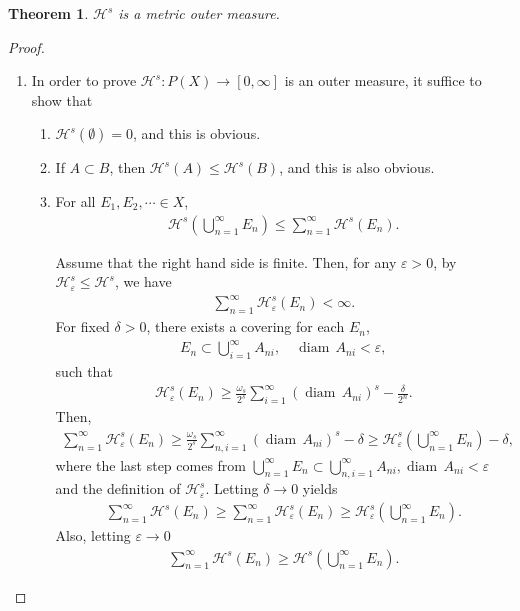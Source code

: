 \documentclass[11pt]{book}
\newtheorem{theorem}{Theorem}[chapter]
\theoremstyle{definition}
\numberwithin{equation}{chapter}
\def\diam{{\operatorname{diam}\,}}
\begin{document}
\begin{theorem}
$\mathcal{H}^s$ is a metric outer measure.
\end{theorem}
\begin{proof}
~\begin{enumerate}[label=(\alph*)]
    \item In order to prove $\mathcal{H}^s: P(X) \to [0,\infty]$ is an outer measure, it suffice to show that
    \begin{enumerate}[label=\arabic*)]
        \item $\mathcal{H}^s(\emptyset) = 0$, and this is obvious.
    
        \item If $A \subset B$, then $\mathcal{H}^s(A) \leq \mathcal{H}^s(B)$, and this is also obvious.
    
        \item For all $E_1, E_2, \cdots \in X$, 
        \begin{align*}
            \mathcal{H}^s\left(\bigcup^\infty_{n=1} E_n\right) \leq \sum^\infty_{n=1} \mathcal{H}^s(E_n).
        \end{align*}
    
        Assume that the right hand side is finite. Then, for any $\varepsilon > 0$, by $\mathcal{H}^s_\varepsilon \leq \mathcal{H}^s$, we have
        \begin{align*}
            \sum^\infty_{n=1} \mathcal{H}^s_\varepsilon(E_n) < \infty.
        \end{align*}
        For fixed $\delta > 0$, there exists a covering for each $E_n$,
        \begin{align*}
            E_n \subset \bigcup^\infty_{i=1} A_{ni},\quad  \diam A_{ni} < \varepsilon,
        \end{align*}
        such that
        \begin{align*}
            \mathcal{H}^s_\varepsilon(E_n) \geq \frac{\omega_s}{2^s} \sum^\infty_{i=1} \left(\diam A_{ni}\right)^s - \frac{\delta}{2^n}.
        \end{align*}
        Then,
        \begin{align*}
            \sum^\infty_{n=1} \mathcal{H}^s_\varepsilon(E_n) \geq \frac{\omega_s}{2^s} \sum^\infty_{n,i=1} \left(\diam A_{ni}\right)^s - \delta \geq \mathcal{H}^s_\varepsilon \left(\bigcup^\infty_{n=1} E_n\right) - \delta,
        \end{align*}
        where the last step comes from $\bigcup^\infty_{n=1} E_n \subset \bigcup^\infty_{n,i=1} A_{ni}, \diam A_{ni} < \varepsilon$ and the definition of $\mathcal{H}^s_\varepsilon$. Letting $\delta \to 0$ yields
        \begin{align*}
            \sum^\infty_{n=1} \mathcal{H}^s(E_n) \geq \sum^\infty_{n=1} \mathcal{H}^s_\varepsilon (E_n) \geq \mathcal{H}^s_\varepsilon \left(\bigcup^\infty_{n=1} E_n\right).
        \end{align*}
        Also, letting $\varepsilon \to 0$ 
        \begin{align*}
            \sum^\infty_{n=1} \mathcal{H}^s(E_n) \geq \mathcal{H}^s \left(\bigcup^\infty_{n=1} E_n\right).
        \end{align*}
    \end{enumerate}
    

\end{enumerate}
\end{proof}
\end{document}
